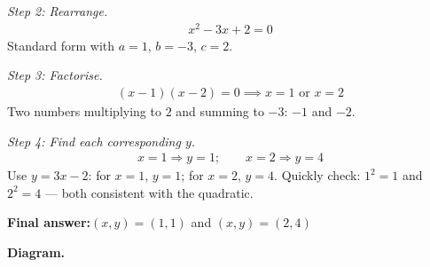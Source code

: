 \documentclass[11pt]{article}
\begin{document}
\textit{Step 2: Rearrange.}
\[\begin{gathered}
x^2 - 3x + 2 = 0
\end{gathered}\]
Standard form with \( a = 1 \), \( b = -3 \), \( c = 2 \).

\textit{Step 3: Factorise.}
\[\begin{gathered}
(x - 1)(x - 2) = 0 \implies x = 1 \text{ or } x = 2
\end{gathered}\]
Two numbers multiplying to \( 2 \) and summing to \( -3 \): \( -1 \) and \( -2 \).

\textit{Step 4: Find each corresponding \( y \).}
\[\begin{gathered}
x = 1 \Rightarrow y = 1; \qquad x = 2 \Rightarrow y = 4
\end{gathered}\]
Use \( y = 3x - 2 \): for \( x = 1 \), \( y = 1 \); for \( x = 2 \), \( y = 4 \). Quickly check: \( 1^2 = 1 \) and \( 2^2 = 4 \) --- both consistent with the quadratic.

\begin{answerbox}
\textbf{Final answer:}\quad \(\displaystyle (x, y) = (1, 1)\) and \(\displaystyle (x, y) = (2, 4)\)
\end{answerbox}
\textbf{Diagram.}
\end{document}
